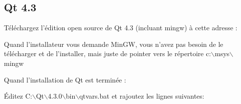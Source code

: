 %
%
%
%

\subsection{Qt 4.3}
Téléchargez l'édition open source de Qt 4.3 (incluant mingw) à cette adresse : 


Quand l'installateur vous demande MinGW, vous n'avez pas besoin de le
télécharger et de l'installer, mais juste de pointer vers le répertoire
c:$\backslash$msys$\backslash$mingw

Quand l'installation de Qt est terminée :

Éditez C:$\backslash$Qt$\backslash$4.3.0$\backslash$bin$\backslash$qtvars.bat et
rajoutez les lignes suivantes:

%
%

